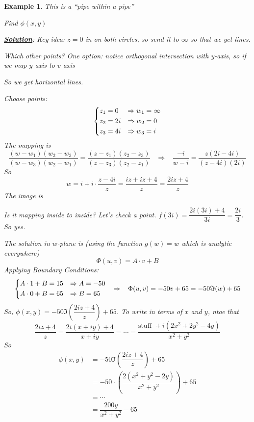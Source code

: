 \documentclass[12pt,titlepage]{article}
\newtheorem{protoexample}[prototheorem]{Example}
\newenvironment{example}
{\colorlet{shadecolor}{red!15}\begin{shaded}\begin{protoexample}\normalfont}{\end{protoexample}\end{shaded}}
\begin{document}
\begin{example}
	This is a ``pipe within a pipe''

	Find $\phi(x,y)$

	\textbf{\underline{Solution}}: Key idea: $z= 0$ in on both circles, so send it to $\infty$ so that we get lines. 

	Which other points? One option: notice orthogonal intersection with $y$-axis, so if we map $y$-axis to $v$-axis


	So we get horizontal lines. 

	Choose points: $$\begin{dcases}
		z_1 = 0 & \Rightarrow w_1 = \infty\\
		z_2 = 2i & \Rightarrow w_2 = 0\\
		z_3 = 4i & \Rightarrow w_3 = i
	\end{dcases}$$
	The mapping is $$\dfrac{(w-w_1)(w_2-w_3)}{(w-w_3)(w_2-w_1)} = \dfrac{(z-z_1)(z_2-z_3)}{(z-z_3)(z_2-z_1)} \;\;\;\Rightarrow \;\;\;\dfrac{-i}{w-i} = \dfrac{z(2i-4i)}{(z-4i)(2i)}$$
	So $$w = i + i\cdot \dfrac{z-4i}{z} = \dfrac{iz+iz+4}{z} = \dfrac{2iz+4}{z}$$
	The image is 

	Is it mapping inside to inside? Let's check a point. $f(3i) = \dfrac{2i(3i)+4}{3i} = \dfrac{2i}{3}$. So yes. 

	The solution in $w$-plane is (using the function $g(w) = w$ which is analytic everywhere) $$\Phi(u,v) = A\cdot v + B$$
	Applying Boundary Conditions: $$\begin{dcases}A \cdot 1 + B = 15 & \Rightarrow A = -50\\ A \cdot 0 + B = 65 & \Rightarrow B = 65\end{dcases} \;\;\;\Rightarrow \;\;\;\Phi(u,v) = -50v+65 = -50\Im(w)+65$$
	So, $\phi(x,y) = -50\Im\left(\dfrac{2iz+4}{z}\right) + 65$. To write in terms of $x$ and $y$, ntoe that $$\dfrac{2iz+4}{z} = \dfrac{2i(x+iy)+4}{x+iy} = \cdots = \dfrac{\text{stuff } + i(2x^2+2y^2-4y)}{x^2+y^2}$$
	So \begin{align*}
		\phi(x,y) &= -50\Im\left(\dfrac{2iz+4}{z}\right) + 65\\
		&= -50\cdot \left(\dfrac{2(x^2+y^2-2y)}{x^2+y^2}\right) + 65\\
		&= \cdots\\
		&= \dfrac{200y}{x^2+y^2}-65
	\end{align*}
\end{example}
\end{document}
